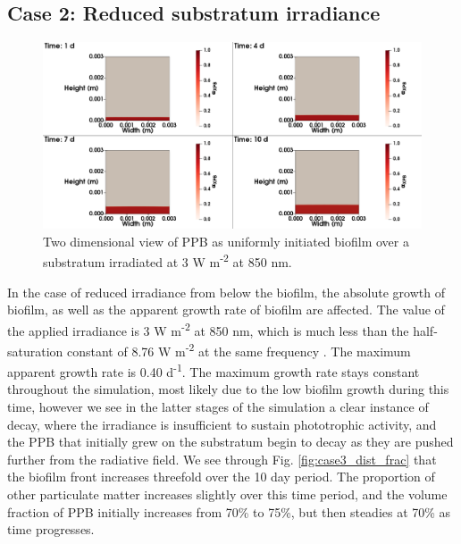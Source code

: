 \subsection{Case 2: Reduced substratum irradiance}
\begin{figure}[H]
    \centering
     \hspace*{-1cm}\includegraphics[width=1.1\textwidth,height=0.4\textheight]{Chap4/methods/data/figures/case3_ppb_frac.png}
    \caption{Two dimensional view of PPB as uniformly initiated biofilm over a substratum irradiated at 3 W m\textsuperscript{-2} at 850 nm.} 
    \label{fig:case3_ppb_frac}
\end{figure}

In the case of reduced irradiance from below the biofilm, the absolute growth of biofilm, as well as the apparent growth rate of biofilm are affected. The value of the applied irradiance is 3 W m\textsuperscript{-2} at 850 nm, which is much less than the half-saturation constant of 8.76 W m\textsuperscript{-2} at the same frequency \cite{eltsova2016}. The maximum apparent growth rate is 0.40 d\textsuperscript{-1}. The maximum growth rate stays constant throughout the simulation, most likely due to the low biofilm growth during this time, however we see in the latter stages of the simulation a clear instance of decay, where the irradiance is insufficient to sustain phototrophic activity, and the PPB that initially grew on the substratum begin to decay  as they are pushed further from the radiative field. We see through Fig. \ref{fig:case3_dist_frac} that the biofilm front increases threefold over the 10 day period. The proportion of other particulate matter increases slightly over this time period, and the volume fraction of PPB initially increases from 70\% to 75\%, but then steadies at 70\% as time progresses. 

